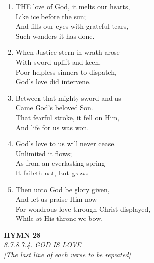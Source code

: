 \documentclass[11pt,a4paper]{article}
\begin{document}
\begin{enumerate}
    \item THE love of God, it melts our hearts, \\
        Like ice before the sun; \\
        And fills our eyes with grateful tears, \\
        Such wonders it has done.

    \item When Justice stern in wrath arose \\
        With sword uplift and keen, \\
        Poor helpless sinners to dispatch, \\
        God's love did intervene.

    \item Between that mighty sword and us \\
        Came God's beloved Son. \\
        That fearful stroke, it fell on Him, \\
        And life for us was won.

    \item God's love to us will never cease, \\
        Unlimited it flows; \\
        As from an everlasting spring \\
        It faileth not, but grows.

    \item Then unto God be glory given, \\
        And let us praise Him now \\
        For wondrous love through Christ displayed, \\
        While at His throne we bow.

\end{enumerate}

\newpage
\begin{center}
    {\Large \textbf{HYMN 28}}
    \\
    \textit{8.7.8.7.4. GOD IS LOVE}
    \\
    \textit{\small [The last line of each verse to be repeated]}
\end{center}
\vspace{1em}
\end{document}

